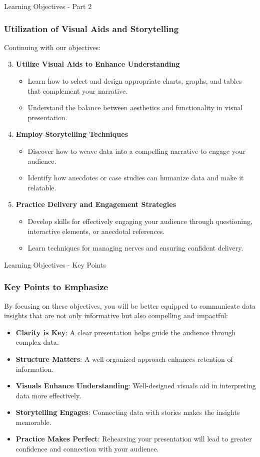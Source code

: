 \documentclass[aspectratio=169]{beamer}
\begin{document}
\begin{frame}[fragile]{Learning Objectives - Part 2}
  \frametitle{Utilization of Visual Aids and Storytelling}
  Continuing with our objectives:
  \begin{enumerate}
    \setcounter{enumi}{2} %
    \item \textbf{Utilize Visual Aids to Enhance Understanding}
    \begin{itemize}
      \item Learn how to select and design appropriate charts, graphs, and tables that complement your narrative.
      \item Understand the balance between aesthetics and functionality in visual presentation.
    \end{itemize}
    
    \item \textbf{Employ Storytelling Techniques}
    \begin{itemize}
      \item Discover how to weave data into a compelling narrative to engage your audience.
      \item Identify how anecdotes or case studies can humanize data and make it relatable.
    \end{itemize}
    
    \item \textbf{Practice Delivery and Engagement Strategies}
    \begin{itemize}
      \item Develop skills for effectively engaging your audience through questioning, interactive elements, or anecdotal references.
      \item Learn techniques for managing nerves and ensuring confident delivery.
    \end{itemize}
  \end{enumerate}
\end{frame}

\begin{frame}[fragile]{Learning Objectives - Key Points}
  \frametitle{Key Points to Emphasize}
  By focusing on these objectives, you will be better equipped to communicate data insights that are not only informative but also compelling and impactful:
  \begin{itemize}
    \item \textbf{Clarity is Key}: A clear presentation helps guide the audience through complex data.
    \item \textbf{Structure Matters}: A well-organized approach enhances retention of information.
    \item \textbf{Visuals Enhance Understanding}: Well-designed visuals aid in interpreting data more effectively.
    \item \textbf{Storytelling Engages}: Connecting data with stories makes the insights memorable.
    \item \textbf{Practice Makes Perfect}: Rehearsing your presentation will lead to greater confidence and connection with your audience.
  \end{itemize}
\end{frame}
\end{document}
